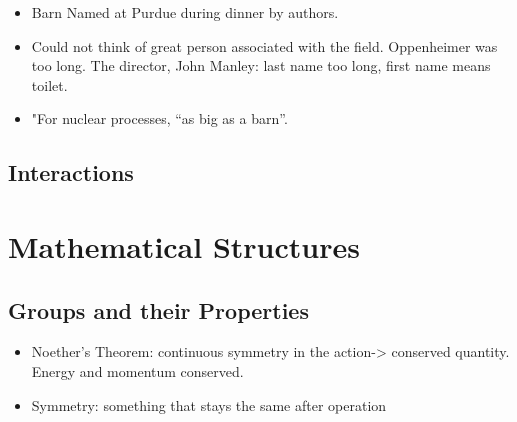 \begin{itemize}
    \item Barn Named at Purdue during dinner by authors. \cite{holloway}
    \item Could not think of great person associated with the field. Oppenheimer was too long. The director, John Manley: last name too long, first name means toilet. \cite{holloway}
    \item "For nuclear processes, ``as big as a barn''. \cite{holloway}
\end{itemize}

\subsection{Interactions}


\section{Mathematical Structures}

\subsection{Groups and their Properties}
\begin{itemize}
    \item Noether's Theorem: continuous symmetry in the action-> conserved quantity. Energy and momentum conserved. \cite{robinson}
    \item Symmetry: something that stays the same after operation \cite{robinson}
\end{itemize}

